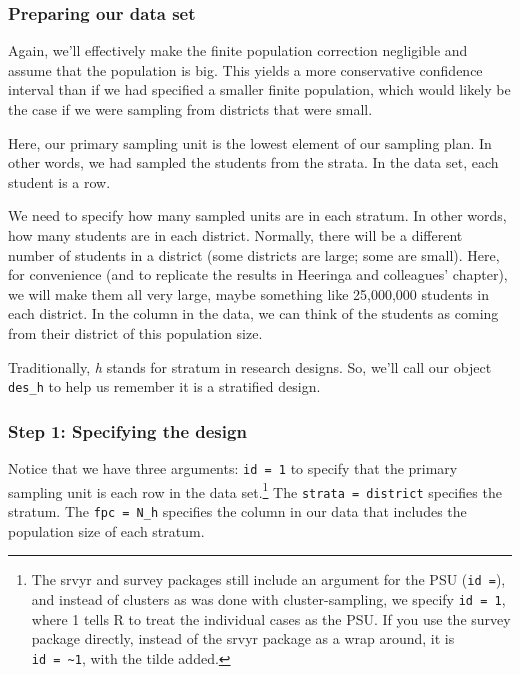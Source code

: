 \documentclass[
]{article}
\newenvironment{Shaded}{\begin{snugshade}}{\end{snugshade}}
\newcommand{\DecValTok}[1]{\textcolor[rgb]{0.00,0.00,0.81}{#1}}
\newcommand{\NormalTok}[1]{#1}
\newcommand{\OperatorTok}[1]{\textcolor[rgb]{0.81,0.36,0.00}{\textbf{#1}}}
\newcommand{\StringTok}[1]{\textcolor[rgb]{0.31,0.60,0.02}{#1}}
\begin{document}
\hypertarget{preparing-our-data-set}{%
\subsubsection{Preparing our data set}\label{preparing-our-data-set}}

Again, we'll effectively make the finite population correction negligible and assume that the population is big. This yields a more conservative confidence interval than if we had specified a smaller finite population, which would likely be the case if we were sampling from districts that were small.

Here, our primary sampling unit is the lowest element of our sampling plan. In other words, we had sampled the students from the strata. In the data set, each student is a row.

We need to specify how many sampled units are in each stratum. In other words, how many students are in each district. Normally, there will be a different number of students in a district (some districts are large; some are small). Here, for convenience (and to replicate the results in Heeringa and colleagues' chapter), we will make them all very large, maybe something like 25,000,000 students in each district. In the column in the data, we can think of the students as coming from their district of this population size.

Traditionally, \emph{h} stands for stratum in research designs. So, we'll call our object \texttt{des\_h} to help us remember it is a stratified design.

\begin{Shaded}
\end{Shaded}

\hypertarget{step-1-specifying-the-design-1}{%
\subsubsection{Step 1: Specifying the design}\label{step-1-specifying-the-design-1}}

Notice that we have three arguments: \texttt{id\ =\ 1} to specify that the primary sampling unit is each row in the data set.\footnote{The srvyr and survey packages still include an argument for the PSU (\texttt{id\ =}), and instead of clusters as was done with cluster-sampling, we specify \texttt{id\ =\ 1}, where 1 tells R to treat the individual cases as the PSU. If you use the survey package directly, instead of the srvyr package as a wrap around, it is \texttt{id\ =\ \textasciitilde{}1}, with the tilde added.} The \texttt{strata\ =\ district} specifies the stratum. The \texttt{fpc\ =\ N\_h} specifies the column in our data that includes the population size of each stratum.
\end{document}
